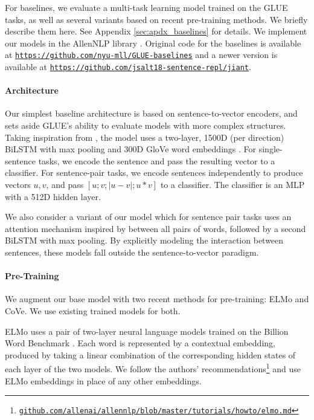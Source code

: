 For baselines, we evaluate a multi-task learning model trained on the GLUE tasks, as well as several variants based on recent pre-training methods. We briefly describe them here. See Appendix \ref{sec:apdx_baselines} for details. We implement our models in the AllenNLP library \citep{Gardner2017AllenNLPAD}. Original code for the baselines is available at \texttt{\href{https://github.com/nyu-mll/GLUE-baselines}{https://github.com/nyu-mll/GLUE-baselines}} 
and a newer version is available at \texttt{\href{https://github.com/jsalt18-sentence-repl/jiant}{https://github.com/jsalt18-sentence-repl/jiant}}.

\paragraph{Architecture}

Our simplest baseline architecture is based on sentence-to-vector encoders, and sets aside GLUE's ability to evaluate models with more complex structures. Taking inspiration from \citet{DBLP:conf/emnlp/ConneauKSBB17}, the model uses a two-layer, 1500D (per direction) BiLSTM with max pooling and 300D GloVe word embeddings \citep[840B Common Crawl version;][]{pennington2014glove}. For single-sentence tasks, we encode the sentence and pass the resulting vector to a classifier. For sentence-pair tasks, we encode sentences independently to produce vectors $u, v$, and pass $[u; v; |u - v|; u * v]$ to a classifier. The classifier is an MLP with a 512D hidden layer.

We also consider a variant of our model which for sentence pair tasks uses an attention mechanism inspired by \citet{seo2016bidirectional} between all pairs of words, followed by a second BiLSTM with max pooling. By explicitly modeling the interaction between sentences, these models fall outside the sentence-to-vector paradigm.

\paragraph{Pre-Training} We augment our base model with two recent methods for pre-training: ELMo and CoVe. We use existing trained models for both.

ELMo uses a pair of two-layer neural language models trained on the Billion Word Benchmark \citep{chelba2013one}. Each word is represented by a contextual embedding, produced by taking a linear combination of the corresponding hidden states of each layer of the two models. We follow the authors' recommendations\footnote{\href{https://github.com/allenai/allennlp/blob/master/tutorials/how_to/elmo.md}{\tt github.com/\allowbreak allenai/\allowbreak allennlp/\allowbreak blob/\allowbreak master/\allowbreak tutorials/\allowbreak how\textunderscore to/\allowbreak elmo.md}} and use ELMo embeddings in place of any other embeddings.

